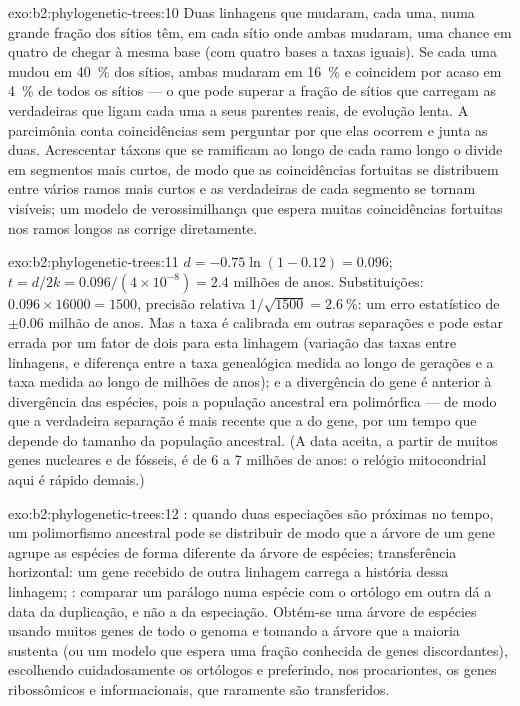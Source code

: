 \begin{solution}{exo:b2:phylogenetic-trees:10}
Duas linhagens que mudaram, cada uma, numa grande fração dos sítios têm,
em cada sítio onde ambas mudaram, uma chance em quatro de chegar à mesma
base (com quatro bases a taxas iguais). Se cada uma mudou em
\qty{40}{\%} dos sítios, ambas mudaram em \qty{16}{\%} e coincidem por
acaso em \qty{4}{\%} de todos os sítios --- o que pode superar a fração
de sítios que carregam as verdadeiras  que ligam cada uma a
seus parentes reais, de evolução lenta. A parcimônia conta coincidências
sem perguntar por que elas ocorrem e junta as duas. Acrescentar táxons
que se ramificam ao longo de cada ramo longo o divide em segmentos mais
curtos, de modo que as coincidências fortuitas se distribuem entre
vários ramos mais curtos e as verdadeiras  de cada segmento
se tornam visíveis; um modelo de verossimilhança que espera muitas
coincidências fortuitas nos ramos longos as corrige diretamente.
\end{solution}

\begin{solution}{exo:b2:phylogenetic-trees:11}
$d = -0.75\ln(1 - 0.12) = 0.096$; $t = d/2k = 0.096/(4\times 10^{-8})
= 2.4$ milhões de anos. Substituições: $0.096\times \num{16000} =
1500$, precisão relativa $1/\sqrt{1500} = \qty{2.6}{\%}$: um erro
estatístico de $\pm 0.06$ milhão de anos. Mas a taxa é calibrada em
outras separações e pode estar errada por um fator de dois para esta
linhagem (variação das taxas entre linhagens, e diferença entre a taxa
genealógica medida ao longo de gerações e a taxa medida ao longo de
milhões de anos); e a divergência do gene é anterior à divergência das
espécies, pois a população ancestral era polimórfica --- de modo que a
verdadeira separação é mais recente que a do gene, por um tempo que
depende do tamanho da população ancestral. (A data aceita, a partir de
muitos genes nucleares e de fósseis, é de 6 a 7 milhões de anos: o
relógio mitocondrial aqui é rápido demais.)
\end{solution}

\begin{solution}{exo:b2:phylogenetic-trees:12}
: quando duas especiações são próximas
no tempo, um polimorfismo ancestral pode se distribuir de modo que a
árvore de um gene agrupe as espécies de forma diferente da árvore de
espécies; transferência horizontal: um gene recebido de outra linhagem
carrega a história dessa linhagem; : comparar um
parálogo numa espécie com o ortólogo em outra dá a data da duplicação, e
não a da especiação. Obtém-se uma árvore de espécies usando muitos genes
de todo o genoma e tomando a árvore que a maioria sustenta (ou um modelo
que espera uma fração conhecida de genes discordantes), escolhendo
cuidadosamente os ortólogos e preferindo, nos procariontes, os genes
ribossômicos e informacionais, que raramente são transferidos.
\end{solution}

